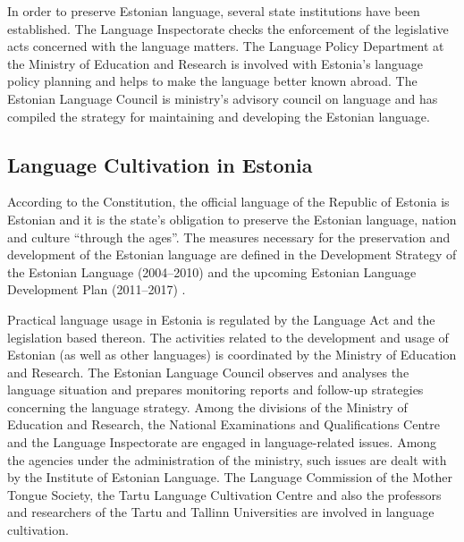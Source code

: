 \begin{multicols}{2}

In order to preserve Estonian language, several state institutions have been established. 
The Language Inspectorate checks the enforcement of the legislative acts concerned with the language matters. 
The Language Policy Department at the Ministry of Education and Research is involved with Estonia's language policy planning and helps to make the language better known abroad. 
The Estonian Language Council is ministry's advisory council on language and has compiled the strategy for maintaining and developing the Estonian language.

\subsection{Language Cultivation in Estonia}

According to the Constitution, the official language of the Republic of Estonia is Estonian and it is the state's obligation to preserve the Estonian language, nation and culture ``through the ages''. 
The measures necessary for the preservation and development of the Estonian language are deﬁned in the Development Strategy of the Estonian Language (2004--2010) \cite{KeeleStratEn} and the upcoming Estonian Language Development Plan (2011--2017) \cite{DevPlan}. 


Practical language usage in Estonia is regulated by the Language Act and the legislation based thereon.
The activities related to the development and usage of Estonian (as well as other languages) is coordinated by the Ministry of Education and Research. 
The Estonian Language Council observes and analyses the language situation and prepares monitoring reports and follow-up strategies concerning the language strategy. 
Among the divisions of the Ministry of Education and Research, the National Examinations and Qualiﬁcations Centre and the Language Inspectorate are engaged in language-related issues. 
Among the agencies under the administration of the ministry, such issues are dealt with by the Institute of Estonian Language. 
The Language Commission of the Mother Tongue Society, the Tartu Language Cultivation Centre and also the professors and researchers of the Tartu and Tallinn Universities are involved in language cultivation.


\end{multicols}
